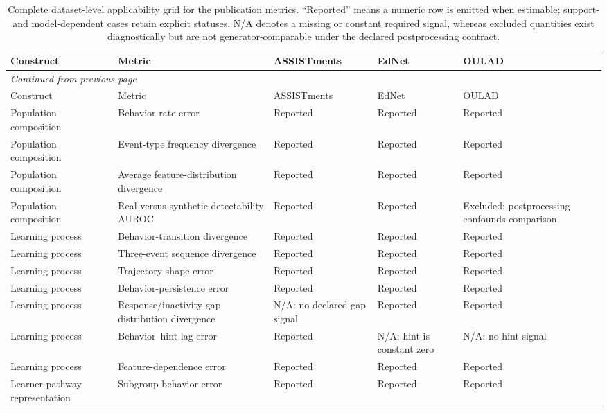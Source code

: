 \scriptsize
\setlength{\tabcolsep}{3pt}
\begin{longtable}{@{}p{2.8cm}p{5.2cm}p{4.65cm}p{4.65cm}p{4.65cm}@{}}
\caption{Complete dataset-level applicability grid for the publication metrics. ``Reported'' means a numeric row is emitted when estimable; support- and model-dependent cases retain explicit statuses. N/A denotes a missing or constant required signal, whereas excluded quantities exist diagnostically but are not generator-comparable under the declared postprocessing contract.}\label{tab:supp-applicability}\\
\toprule
Construct & Metric & ASSISTments & EdNet & OULAD \\
\midrule
\endfirsthead
\multicolumn{5}{l}{\textit{Continued from previous page}}\\
\toprule
Construct & Metric & ASSISTments & EdNet & OULAD \\
\midrule
\endhead
\bottomrule
\endlastfoot
Population composition & Behavior-rate error & Reported & Reported & Reported \\
Population composition & Event-type frequency divergence & Reported & Reported & Reported \\
Population composition & Average feature-distribution divergence & Reported & Reported & Reported \\
Population composition & Real-versus-synthetic detectability AUROC & Reported & Reported & Excluded: postprocessing confounds comparison \\
Learning process & Behavior-transition divergence & Reported & Reported & Reported \\
Learning process & Three-event sequence divergence & Reported & Reported & Reported \\
Learning process & Trajectory-shape error & Reported & Reported & Reported \\
Learning process & Behavior-persistence error & Reported & Reported & Reported \\
Learning process & Response/inactivity-gap distribution divergence & N/A: no declared gap signal & Reported & Reported \\
Learning process & Behavior--hint lag error & Reported & N/A: hint is constant zero & N/A: no hint signal \\
Learning process & Feature-dependence error & Reported & Reported & Reported \\
Learner-pathway representation & Subgroup behavior error & Reported & Reported & Reported \\

\end{longtable}
